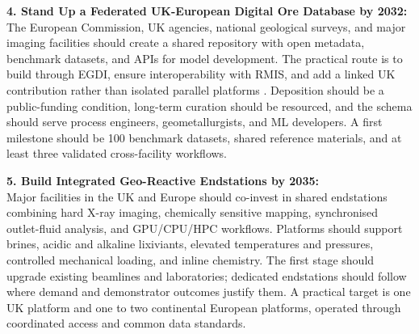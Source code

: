 \documentclass[12pt,a4paper]{article}
\begin{document}
\begin{tcolorbox}
\vspace{2.4mm}
\textbf{4. Stand Up a Federated UK-European Digital Ore Database by 2032:}\\
The European Commission, UK agencies, national geological surveys, and major imaging facilities should create a shared repository with open metadata, benchmark datasets, and APIs for model development. The practical route is to build through EGDI, ensure interoperability with RMIS, and add a linked UK contribution rather than isolated parallel platforms \cite{egdi_2026, rmis_2026, bgs_uk_crm_2022}. Deposition should be a public-funding condition, long-term curation should be resourced, and the schema should serve process engineers, geometallurgists, and ML developers. A first milestone should be 100 benchmark datasets, shared reference materials, and at least three validated cross-facility workflows.

\vspace{2.4mm}
\textbf{5. Build Integrated Geo-Reactive Endstations by 2035:}\\
Major facilities in the UK and Europe should co-invest in shared endstations combining hard X-ray imaging, chemically sensitive mapping, synchronised outlet-fluid analysis, and GPU/CPU/HPC workflows. Platforms should support brines, acidic and alkaline lixiviants, elevated temperatures and pressures, controlled mechanical loading, and inline chemistry. The first stage should upgrade existing beamlines and laboratories; dedicated endstations should follow where demand and demonstrator outcomes justify them. A practical target is one UK platform and one to two continental European platforms, operated through coordinated access and common data standards.
\end{tcolorbox}
\clearpage
\restoregeometry
\end{document}
